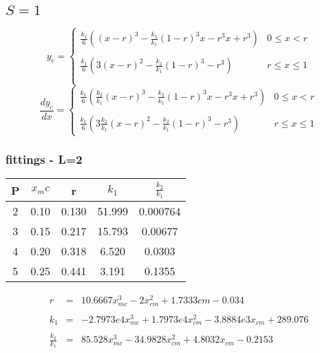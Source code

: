 \documentclass[11pt, a4paper]{article}
\begin{document}
\subsection{$S=1$}
\begin{equation}
    y_c=\left\{\begin{array}{cc}
        \displaystyle \frac{k_1}{6}\left((x-r)^3-\frac{k_2}{k_1}\left(1-r\right)^3x-r^3x+r^3\right) & 0\le x<r \\\\
        \displaystyle \frac{k_1}{6}\left(3(x-r)^2-\frac{k_2}{k_1}\left(1-r\right)^3-r^3\right) & r\le x\le 1 \\\\
    \end{array}\right.
\end{equation}
\begin{equation}
    \frac{dy_c}{dx}=\left\{\begin{array}{cc}
        \displaystyle \frac{k_1}{6}\left(\frac{k_2}{k_1}(x-r)^3-\frac{k_2}{k_1}\left(1-r\right)^3x-r^3x+r^3\right) & 0\le x<r \\\\
        \displaystyle \frac{k_1}{6}\left(3\frac{k_2}{k_1}(x-r)^2-\frac{k_2}{k_1}\left(1-r\right)^3-r^3\right) & r\le x\le 1
    \end{array}\right.
\end{equation}

\subsubsection{fittings - L=2} \begin{table}[H]
    \renewcommand{\arraystretch}{1.5}
    \begin{center}
        \begin{tabular}{c|c|c|c|c}
            P & $x_mc$ & r & $k_1$ & $\frac{k_2}{k_1}$ \\
            \hline
            2 & 0.10 & 0.130 & 51.999 & 0.000764 \\
            3 & 0.15 & 0.217 & 15.793 & 0.00677 \\
            4 & 0.20 & 0.318 & 6.520  & 0.0303 \\
            5 & 0.25 & 0.441 & 3.191  & 0.1355
        \end{tabular}
    \end{center}
\end{table}
\begin{equation}
    \begin{array}{rcl}
        r & = & 10.6667x_{mc}^3-2x_{cm}^2+1.7333{cm}-0.034 \\\\
        k_1 & = & -2.7973e4x_{mc}^3+1.7973e4x_{cm}^2-3.8884e3x_{cm}+289.076 \\\\ 
        \displaystyle \frac{k_2}{k_1} & = & 85.528x_{mc}^3-34.9828x_{cm}^2+4.8032x_{cm}-0.2153
    \end{array}
\end{equation}
\end{document}

